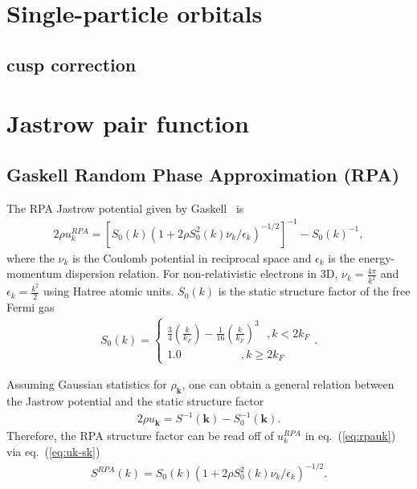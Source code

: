 \documentclass[draftthesis,fullpage]{uiucthesis}
\newcommand{\bs}{\boldsymbol}
\begin{document}
\section{Single-particle orbitals}
\subsection{cusp correction}
\section{Jastrow pair function}
\subsection{Gaskell Random Phase Approximation (RPA)}
The RPA Jastrow potential given by Gaskell~\cite{Gaskell1961, Ceperley1978, Holzmann2009, Holzmann2016} is
\begin{align}
2\rho u^{RPA}_k = \left[ S_0(k) \left( 1 + 2\rho S_0^2(k) \nu_k/\epsilon_k \right)^{-1/2} \right] ^{-1} - S_0(k)^{-1}, \label{eq:rpauk}
\end{align}
where the $\nu_k$ is the Coulomb potential in reciprocal space and $\epsilon_k$ is the energy-momentum dispersion relation. For non-relativistic electrons in 3D, $\nu_k=\frac{4\pi}{k^2}$ and $\epsilon_k=\frac{k^2}{2}$ using Hatree atomic units. $S_0(k)$ is the static structure factor of the free Fermi gas
\begin{align}
S_0(k) = \left\{\begin{array}{l}
\frac{3}{4}\left( \frac{k}{k_F} \right) - \frac{1}{16}\left(\frac{k}{k_F}\right)^3 ~~~, k<2k_F \\
1.0 ~~~~~~~~~~~~~~~~~~~~~~~~, k \geq 2k_F
\end{array}\right..
\end{align}

Assuming Gaussian statistics for $\rho_{\bs{k}}$, one can obtain a general relation between the Jastrow potential and the static structure factor~\cite{Holzmann2011} %
\begin{align}
2\rho u_{\bs{k}} = S^{-1}(\bs{k}) - S^{-1}_0(\bs{k}). \label{eq:uk-sk}
\end{align}
Therefore, the RPA structure factor can be read off of $u^{RPA}_k$ in eq.~(\ref{eq:rpauk}) via eq.~(\ref{eq:uk-sk})
\begin{align}
S^{RPA}(k) = S_0(k)\left( 1 + 2\rho S_0^2(k) \nu_k/\epsilon_k \right)^{-1/2}. \label{eq:rpask}
\end{align}
\end{document}
